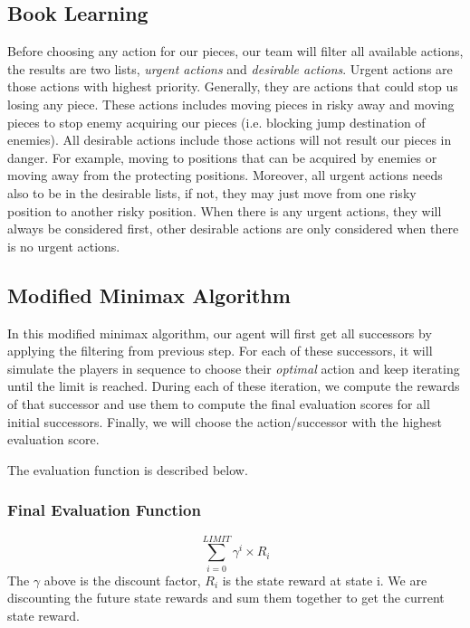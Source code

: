 \documentclass[UTF8,11pt]{article}
\begin{document}
        \subsection{Book Learning}
        Before choosing any action for our pieces, our team will filter all available
        actions, the results are two lists, \textit{urgent actions} and \textit{desirable actions}.
        Urgent actions are those actions with highest priority. Generally, they are
        actions that could stop us losing any piece. These actions includes moving
        pieces in risky away and moving pieces to stop enemy acquiring our pieces (i.e.
        blocking jump destination of enemies). All desirable actions include those 
        actions will not result our pieces in danger. For example, moving to positions
        that can be acquired by enemies or moving away from the protecting positions. Moreover,
        all urgent actions needs also to be in the desirable lists, if not, they may just
        move from one risky position to another risky position. When there is any
        urgent actions, they will always be considered first, other desirable actions are
        only considered when there is no urgent actions.
        \subsection{Modified Minimax Algorithm}
        In this modified minimax algorithm, our agent will first get all successors by applying
        the filtering from previous step. For each of these successors, it will simulate
        the players in sequence to choose their \textit{optimal} action and keep iterating
        until the limit is reached. During each of these iteration, we compute the
        rewards of that successor and use them to compute the final evaluation scores for
        all initial successors. 
        Finally, we will choose the action/successor with the highest
        evaluation score. \par
        The evaluation function is described below.
        \subsubsection{Final Evaluation Function}
            \begin{equation}
                \sum_{i=0}^{LIMIT} \gamma^i \times R_i
            \end{equation}
        The $\gamma$ above is the discount factor, $R_i$ is the state reward at state i.
        We are discounting the future state rewards and sum them together to get
        the current state reward.
\end{document}
